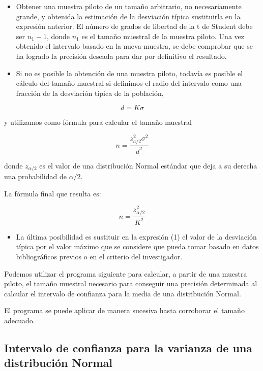\documentclass[
]{article}
\providecommand{\tightlist}{%
  \setlength{\itemsep}{0pt}\setlength{\parskip}{0pt}}
\begin{document}
\begin{itemize}
\tightlist
\item
  Obtener una muestra piloto de un tamaño arbitrario, no necesariamente grande, y obtenida la estimación de la desviación típica sustituirla en la expresión anterior. El número de grados de libertad de la t de Student debe ser \(n_{1}-1\), donde \(n_{1}\) es el tamaño muestral de la muestra piloto. Una vez obtenido el intervalo basado en la nueva muestra, se debe comprobar que se ha logrado la precisión deseada para dar por definitivo el resultado.
\item
  Si no es posible la obtención de una muestra piloto, todavía es posible el cálculo del tamaño muestral si definimos el radio del intervalo como una fracción de la desviación típica de la población,
\end{itemize}

\[
d=K \sigma
\]

y utilizamos como fórmula para calcular el tamaño muestral

\[
n=\frac{z_{a / 2}^{2} \sigma^{2}}{d^{2}}
\]

donde \(z_{\alpha / 2}\) es el valor de una distribución Normal estándar que deja a su derecha una probabilidad de \(\alpha / 2\).

La fórmula final que resulta es:

\[
n=\frac{z_{\alpha / 2}^{2}}{K^{2}}
\]

\begin{itemize}
\tightlist
\item
  La última posibilidad es sustituir en la expresión (1) el valor de la desviación típica por el valor máximo que se considere que pueda tomar basado en datos bibliográficos previos o en el criterio del investigador.
\end{itemize}

Podemos utilizar el programa siguiente para calcular, a partir de una muestra piloto, el tamaño muestral necesario para conseguir una precisión determinada al calcular el intervalo de confianza para la media de una distribución Normal.

El programa se puede aplicar de manera
sucesiva hasta corroborar el tamaño adecuado.

\subsection{Intervalo de confianza para la varianza de una distribución Normal}\label{intervalo-de-confianza-para-la-varianza-de-una-distribuciuxf3n-normal}
\end{document}
